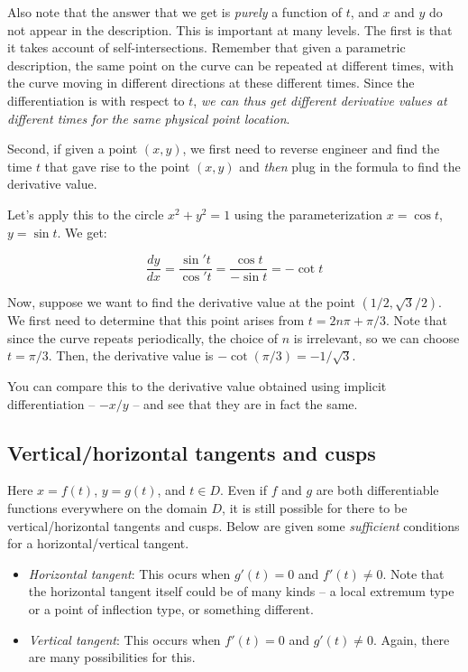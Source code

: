 \documentclass[10pt]{amsart}
\begin{document}
Also note that the answer that we get is {\em purely} a function of
$t$, and $x$ and $y$ do not appear in the description. This is
important at many levels. The first is that it takes account of
self-intersections. Remember that given a parametric description, the
same point on the curve can be repeated at different times, with the
curve moving in different directions at these different times. Since
the differentiation is with respect to $t$, {\em we can thus get
different derivative values at different times for the same physical
point location}.

Second, if given a point $(x,y)$, we first need to reverse engineer
and find the time $t$ that gave rise to the point $(x,y)$ and {\em
then} plug in the formula to find the derivative value.

Let's apply this to the circle $x^2 + y^2 = 1$ using the
parameterization $x = \cos t$, $y = \sin t$. We get:

$$\frac{dy}{dx} = \frac{\sin't}{\cos't} = \frac{\cos t}{-\sin t} = -\cot t$$

Now, suppose we want to find the derivative value at the point
$(1/2,\sqrt{3}/2)$. We first need to determine that this point arises
from $t = 2n\pi + \pi/3$. Note that since the curve repeats
periodically, the choice of $n$ is irrelevant, so we can choose $t =
\pi/3$. Then, the derivative value is $-\cot(\pi/3) = -1/\sqrt{3}$.

You can compare this to the derivative value obtained using implicit
differentiation -- $-x/y$ -- and see that they are in fact the same.

\subsection{Vertical/horizontal tangents and cusps}

Here $x = f(t)$, $y = g(t)$, and $t \in D$. Even if $f$ and $g$ are
both differentiable functions everywhere on the domain $D$, it is
still possible for there to be vertical/horizontal tangents and
cusps. Below are given some {\em sufficient} conditions for a
horizontal/vertical tangent.

\begin{itemize}
\item {\em Horizontal tangent}: This ocurs when $g'(t) = 0$ and $f'(t)
  \ne 0$. Note that the horizontal tangent itself could be of many
  kinds -- a local extremum type or a point of inflection type, or
  something different.
\item {\em Vertical tangent}: This occurs when $f'(t) = 0$ and $g'(t)
  \ne 0$. Again, there are many possibilities for this.
\end{itemize}
\end{document}
